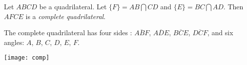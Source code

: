 \documentclass[12pt]{article}
\begin{document}
Let $ABCD$ be a quadrilateral. Let $\{F\}=AB\bigcap CD$ and
$\{E\}=BC\bigcap AD$. Then $AFCE$ is a \emph{complete
quadrilateral}.

The complete quadrilateral has four sides : $\overline{ABF}$,
$\overline{ADE}$, $\overline{BCE}$, $\overline{DCF}$, and six
angles: $A$, $B$, $C$, $D$, $E$, $F$.

\begin{center}
\texttt{[image: comp]}
\end{center}
\end{document}

